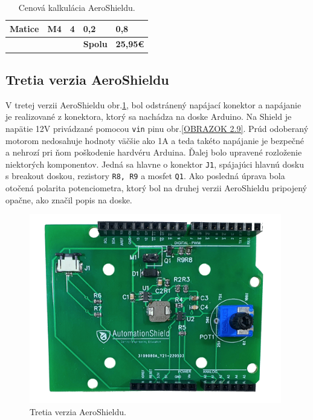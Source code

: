 \begin{table}
\begin{tabular}{p{} p{} p{} p{} p{}}
		Matice                              & M4                                                 & 4                                  & 0,2                                      & 0,8                                        \\ \hline
		\multicolumn{1}{|l}{}               &                                                    & \multicolumn{1}{l}{}               & \textbf{Spolu}                           & \multicolumn{1}{c|}{\textbf{25,95\euro}}        \\ \hline
	\end{tabular}
\caption{Cenová kalkulácia AeroShieldu.}
\label{Cenova kalkulacia}
\end{table}

\subsection{Tretia verzia AeroShieldu}
\label{tretia}

V tretej verzii AeroShieldu obr.\ref{OBRAZOK 2.8}, bol odstránený napájací konektor a napájanie je realizované z konektora, ktorý sa nachádza na doske Arduino. Na Shield je napätie 12V privádzané pomocou \verb|vin| pinu obr.\ref{OBRAZOK 2.9}. Prúd odoberaný motorom nedosahuje hodnoty väčšie ako 1A a teda takéto napájanie je bezpečné a nehrozí pri ňom poškodenie hardvéru Arduina. Ďalej bolo upravené rozloženie niektorých komponentov. Jedná sa hlavne o konektor \verb|J1|, spájajúci hlavnú dosku s breakout doskou, rezistory \verb|R8, R9| a mosfet \verb|Q1|. Ako posledná úprava bola otočená polarita potenciometra, ktorý bol na druhej verzii AeroShieldu pripojený opačne, ako značil popis na doske. 

\begin{figure}[!tbh]
	\centering
	\includegraphics[width=110mm]{obr/NewAeroShield.png}
	\caption{Tretia verzia AeroShieldu.}\label{OBRAZOK 2.8}
\end{figure}

